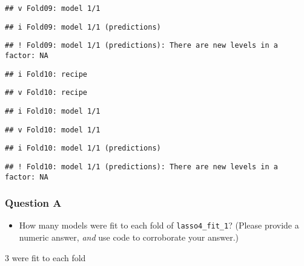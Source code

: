\documentclass[
]{article}
\newenvironment{Shaded}{\begin{snugshade}}{\end{snugshade}}
\newcommand{\DecValTok}[1]{\textcolor[rgb]{0.00,0.00,0.81}{#1}}
\newcommand{\KeywordTok}[1]{\textcolor[rgb]{0.13,0.29,0.53}{\textbf{#1}}}
\newcommand{\NormalTok}[1]{#1}
\newcommand{\OperatorTok}[1]{\textcolor[rgb]{0.81,0.36,0.00}{\textbf{#1}}}
\newcommand{\StringTok}[1]{\textcolor[rgb]{0.31,0.60,0.02}{#1}}
\providecommand{\tightlist}{%
  \setlength{\itemsep}{0pt}\setlength{\parskip}{0pt}}
\begin{document}
\begin{verbatim}
## v Fold09: model 1/1
\end{verbatim}

\begin{verbatim}
## i Fold09: model 1/1 (predictions)
\end{verbatim}

\begin{verbatim}
## ! Fold09: model 1/1 (predictions): There are new levels in a factor: NA
\end{verbatim}

\begin{verbatim}
## i Fold10: recipe
\end{verbatim}

\begin{verbatim}
## v Fold10: recipe
\end{verbatim}

\begin{verbatim}
## i Fold10: model 1/1
\end{verbatim}

\begin{verbatim}
## v Fold10: model 1/1
\end{verbatim}

\begin{verbatim}
## i Fold10: model 1/1 (predictions)
\end{verbatim}

\begin{verbatim}
## ! Fold10: model 1/1 (predictions): There are new levels in a factor: NA
\end{verbatim}

\hypertarget{question-a}{%
\subsubsection{Question A}\label{question-a}}

\begin{itemize}
\tightlist
\item
  How many models were fit to each fold of \texttt{lasso4\_fit\_1}?
  (Please provide a numeric answer, \emph{and} use code to corroborate
  your answer.)
\end{itemize}

3 were fit to each fold

\begin{Shaded}
\end{Shaded}
\end{document}
